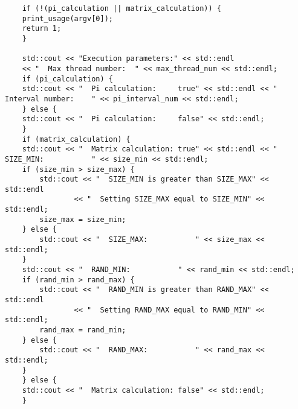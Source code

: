 \documentclass{report}
\begin{document}
\begin{lstlisting}
	if (!(pi_calculation || matrix_calculation)) {
	print_usage(argv[0]);
	return 1;
	}

	std::cout << "Execution parameters:" << std::endl
	<< "  Max thread number:  " << max_thread_num << std::endl;
	if (pi_calculation) {
	std::cout << "  Pi calculation:     true" << std::endl << "  Interval number:    " << pi_interval_num << std::endl;
	} else {
	std::cout << "  Pi calculation:     false" << std::endl;
	}
	if (matrix_calculation) {
	std::cout << "  Matrix calculation: true" << std::endl << "  SIZE_MIN:           " << size_min << std::endl;
	if (size_min > size_max) {
		std::cout << "  SIZE_MIN is greater than SIZE_MAX" << std::endl
				<< "  Setting SIZE_MAX equal to SIZE_MIN" << std::endl;
		size_max = size_min;
	} else {
		std::cout << "  SIZE_MAX:           " << size_max << std::endl;
	}
	std::cout << "  RAND_MIN:           " << rand_min << std::endl;
	if (rand_min > rand_max) {
		std::cout << "  RAND_MIN is greater than RAND_MAX" << std::endl
				<< "  Setting RAND_MAX equal to RAND_MIN" << std::endl;
		rand_max = rand_min;
	} else {
		std::cout << "  RAND_MAX:           " << rand_max << std::endl;
	}
	} else {
	std::cout << "  Matrix calculation: false" << std::endl;
	}


\end{lstlisting}
\end{document}
